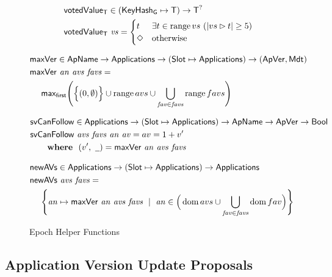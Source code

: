 \begin{figure}[htb]
  \begin{align*}
      & \mathsf{votedValue_T} \in (\mathsf{KeyHash_G}\mapsto\mathsf{T}) \to \mathsf{T}^?\\
      & \mathsf{votedValue_T}~\mathit{vs} =
        \begin{cases}
          t & \exists t\in\operatorname{range}{vs}~(|vs\rhd t|\geq 5) \\
          \Diamond & \text{otherwise} \\
        \end{cases}
  \end{align*}

  \begin{align*}
      & \mathsf{maxVer} \in \mathsf{ApName} \to \mathsf{Applications} \to (\mathsf{Slot}\mapsto\mathsf{Applications})
        \to (\mathsf{ApVer}, \mathsf{Mdt})\\
      & \mathsf{maxVer}~\mathit{an}~\mathit{avs}~\mathit{favs} = \\
      & ~~~~\mathsf{max_{first}} \Bigg(
        \Big\{(0, \emptyset)\Big\}
        \cup
        \operatorname{range}{avs}
        \cup
        \bigcup_{\mathit{fav}\in\mathit{favs}}
        \operatorname{range}{favs}
        \Bigg)
  \end{align*}

  \begin{align*}
      & \fun{svCanFollow} \in \Applications \to (\Slot\mapsto\Applications)
        \to \ApName \to \ApVer \to \Bool\\
      & \fun{svCanFollow}~\var{avs}~\var{favs}~\var{an}~\var{av}= av = 1 + v' \\
      & ~~~~\where (v',~\wcard) = \fun{maxVer}~\var{an}~\var{avs}~\var{favs}
  \end{align*}

  \begin{align*}
      & \mathsf{newAVs} \in \mathsf{Applications} \to (\mathsf{Slot}\mapsto\mathsf{Applications}) \to \mathsf{Applications} \\
      & \mathsf{newAVs}~\mathit{avs}~\mathit{favs} = \\
      & ~~~~\Bigg\{\mathit{an}\mapsto\mathsf{maxVer}~\mathit{an}~\mathit{avs}~\mathit{favs}
            ~\mid~
            \mathit{an}\in\Big(\operatorname{dom}{avs}\cup\bigcup_{\mathit{fav}\in\mathit{favs}}\operatorname{dom}{fav}\Big)
            \Bigg\}
  \end{align*}

  \caption{Epoch Helper Functions}
  \label{fig:funcs:helper-updates}
\end{figure}

\subsection{Application Version Update Proposals}
\label{sec:app-proposals}

